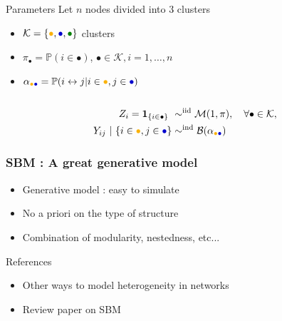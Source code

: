 \documentclass[compress,10pt]{beamer}
\begin{document}
\begin{frame}
\begin{center}
\begin{overlayarea}{\textwidth}{.5\textheight}
\begin{columns}
        \begin{column}{.5\paperwidth}
          \begin{small}
            \begin{block}{Parameters}
              Let $n$ nodes divided into $3$ clusters
              \begin{itemize}
              \item
                $\mathcal{K}=\{\textcolor{yellow!40!orange}{\bullet},\textcolor{blue!80!black}{\bullet},\textcolor{green!50!black}{\bullet}\}$
                 clusters
              \item  $\pi_\bullet  =  \mathbb{P}(i  \in  \bullet)$,
                $\bullet\in\mathcal{K},i=1,\dots,n$
              \item      $\alpha_{\textcolor{yellow!40!orange}{\bullet}\textcolor{blue!80!black}{\bullet}}     =      \mathbb{P}(i
                \leftrightarrow j | i\in\textcolor{yellow!40!orange}{\bullet},j\in\textcolor{blue!80!black}{\bullet})$
              \end{itemize}
            \end{block}
          \end{small}
        \end{column}
      \end{columns}
    \end{overlayarea}
  \end{center}
  
\begin{align*}
Z_i = \mathbf{1}_{\{i \in \bullet\}}  \ & \sim^{\text{iid}} \mathcal{M}(1,\pi), \quad \forall\bullet \in \mathcal{K}, \\ 
Y_{ij} \ | \ \{i\in\textcolor{yellow!40!orange}{\bullet},j\in\textcolor{blue!80!black}{\bullet}\}
& \sim^{\text{ind}} \mathcal{B}(\alpha_{\textcolor{yellow!40!orange}{\bullet}\textcolor{blue!80!black}{\bullet}})\\
\end{align*}

\end{frame}


\begin{frame}\frametitle{SBM : A great generative model}
\begin{itemize}
\item  Generative model : easy to simulate
\item No a priori on the type of structure
\item Combination of modularity, nestedness, etc... 
\end{itemize}


\alert{References}
\begin{itemize}
 \item Other ways to model heterogeneity in networks \textcolor{mygreen}{\cite{matias2014ESAIM}}
\item Review paper on SBM \textcolor{mygreen}{\cite{Lee2019}}
\end{itemize}


\end{frame}
\end{document}
